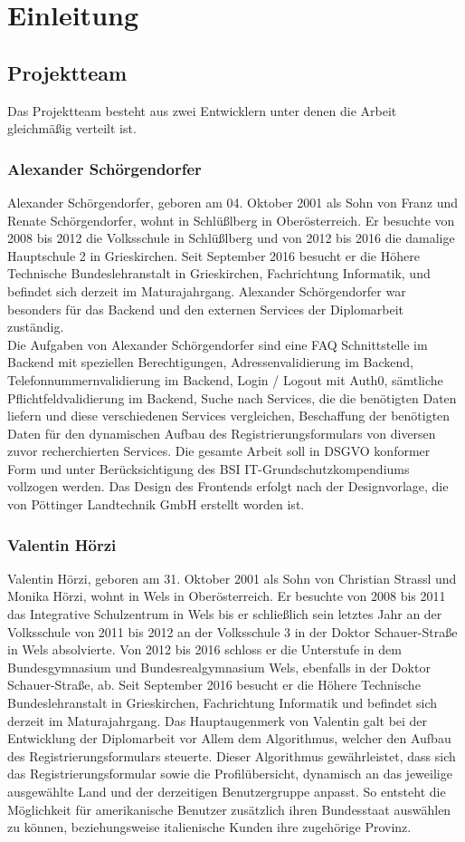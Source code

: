 \chapter{Einleitung} \label{sec:einleitung}
\section{Projektteam}
Das Projektteam besteht aus zwei Entwicklern unter denen die Arbeit gleichmäßig verteilt ist.
\subsection{Alexander Schörgendorfer}
Alexander Schörgendorfer, geboren am 04. Oktober 2001 als Sohn von Franz und Renate Schörgendorfer, wohnt in Schlüßlberg in Oberösterreich. Er besuchte von 2008 bis 2012 die Volksschule in Schlüßlberg und von 2012 bis 2016 die damalige Hauptschule 2 in Grieskirchen. Seit September 2016 besucht er die Höhere Technische Bundeslehranstalt in Grieskirchen, Fachrichtung Informatik, und befindet sich derzeit im Maturajahrgang. Alexander Schörgendorfer war besonders für das Backend und den externen Services der Diplomarbeit zuständig.\\
Die Aufgaben von Alexander Schörgendorfer sind eine FAQ Schnittstelle im Backend mit speziellen Berechtigungen, Adressenvalidierung im Backend, Telefonnummernvalidierung im Backend, Login / Logout mit Auth0, sämtliche Pflichtfeldvalidierung im Backend, Suche nach Services, die die benötigten Daten liefern und diese verschiedenen Services vergleichen, Beschaffung der benötigten Daten für den dynamischen Aufbau des Registrierungsformulars von diversen zuvor recherchierten Services. Die gesamte Arbeit soll in DSGVO konformer Form und unter Berücksichtigung des BSI IT-Grundschutzkompendiums vollzogen werden. Das Design des Frontends erfolgt nach der Designvorlage, die von Pöttinger Landtechnik GmbH erstellt worden ist.
\subsection{Valentin Hörzi}
Valentin Hörzi, geboren am 31. Oktober 2001 als Sohn von Christian Strassl und Monika Hörzi, wohnt in Wels in Oberösterreich. Er besuchte 
von 2008 bis 2011 das Integrative Schulzentrum in Wels bis er schließlich sein letztes Jahr an der Volksschule von 2011 bis 2012 an der Volksschule 3 in der Doktor Schauer-Straße in Wels absolvierte. Von 2012 bis 2016 schloss er die Unterstufe in dem Bundesgymnasium und Bundesrealgymnasium Wels, ebenfalls in der Doktor Schauer-Straße, ab. Seit September 2016 besucht er die Höhere Technische  Bundeslehranstalt in Grieskirchen, Fachrichtung Informatik und befindet sich derzeit im Maturajahrgang. Das Hauptaugenmerk von Valentin galt bei der Entwicklung der Diplomarbeit vor Allem dem Algorithmus, welcher den Aufbau des Registrierungsformulars steuerte.
Dieser Algorithmus gewährleistet, dass sich das Registrierungsformular sowie die Profilübersicht, dynamisch an das jeweilige ausgewählte Land und der derzeitigen Benutzergruppe anpasst. So entsteht die Möglichkeit für amerikanische Benutzer zusätzlich ihren Bundesstaat auswählen zu können, beziehungsweise italienische Kunden ihre zugehörige Provinz. 
